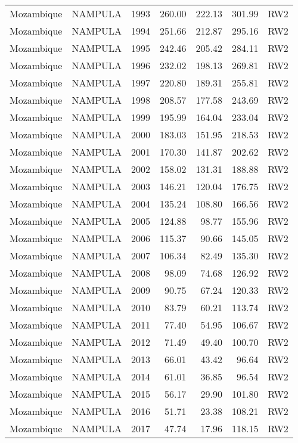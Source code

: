 \begin{longtable}{lllrrrl}
  Mozambique & NAMPULA & 1993 & 260.00 & 222.13 & 301.99 & RW2 \\ 
  Mozambique & NAMPULA & 1994 & 251.66 & 212.87 & 295.16 & RW2 \\ 
  Mozambique & NAMPULA & 1995 & 242.46 & 205.42 & 284.11 & RW2 \\ 
  Mozambique & NAMPULA & 1996 & 232.02 & 198.13 & 269.81 & RW2 \\ 
  Mozambique & NAMPULA & 1997 & 220.80 & 189.31 & 255.81 & RW2 \\ 
  Mozambique & NAMPULA & 1998 & 208.57 & 177.58 & 243.69 & RW2 \\ 
  Mozambique & NAMPULA & 1999 & 195.99 & 164.04 & 233.04 & RW2 \\ 
  Mozambique & NAMPULA & 2000 & 183.03 & 151.95 & 218.53 & RW2 \\ 
  Mozambique & NAMPULA & 2001 & 170.30 & 141.87 & 202.62 & RW2 \\ 
  Mozambique & NAMPULA & 2002 & 158.02 & 131.31 & 188.88 & RW2 \\ 
  Mozambique & NAMPULA & 2003 & 146.21 & 120.04 & 176.75 & RW2 \\ 
  Mozambique & NAMPULA & 2004 & 135.24 & 108.80 & 166.56 & RW2 \\ 
  Mozambique & NAMPULA & 2005 & 124.88 & 98.77 & 155.96 & RW2 \\ 
  Mozambique & NAMPULA & 2006 & 115.37 & 90.66 & 145.05 & RW2 \\ 
  Mozambique & NAMPULA & 2007 & 106.34 & 82.49 & 135.30 & RW2 \\ 
  Mozambique & NAMPULA & 2008 & 98.09 & 74.68 & 126.92 & RW2 \\ 
  Mozambique & NAMPULA & 2009 & 90.75 & 67.24 & 120.33 & RW2 \\ 
  Mozambique & NAMPULA & 2010 & 83.79 & 60.21 & 113.74 & RW2 \\ 
  Mozambique & NAMPULA & 2011 & 77.40 & 54.95 & 106.67 & RW2 \\ 
  Mozambique & NAMPULA & 2012 & 71.49 & 49.40 & 100.70 & RW2 \\ 
  Mozambique & NAMPULA & 2013 & 66.01 & 43.42 & 96.64 & RW2 \\ 
  Mozambique & NAMPULA & 2014 & 61.01 & 36.85 & 96.54 & RW2 \\ 
  Mozambique & NAMPULA & 2015 & 56.17 & 29.90 & 101.80 & RW2 \\ 
  Mozambique & NAMPULA & 2016 & 51.71 & 23.38 & 108.21 & RW2 \\ 
  Mozambique & NAMPULA & 2017 & 47.74 & 17.96 & 118.15 & RW2 \\ 

\end{longtable}
